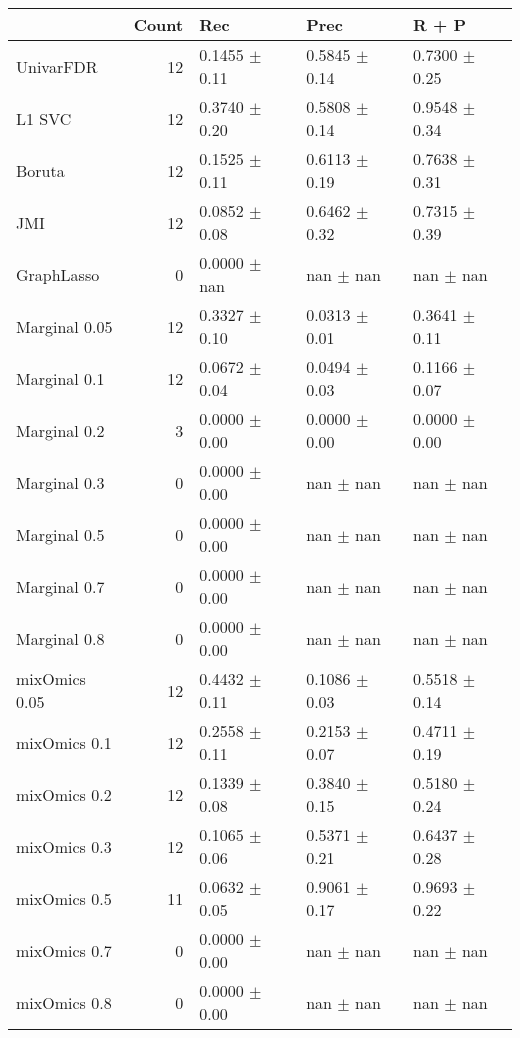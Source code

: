 \begin{tabular}{lrlll}
\toprule
{} &  Count &                Rec &               Prec &              R + P \\
\midrule
UnivarFDR     &     12 &  0.1455 $\pm$ 0.11 &  0.5845 $\pm$ 0.14 &  0.7300 $\pm$ 0.25 \\
L1 SVC        &     12 &  0.3740 $\pm$ 0.20 &  0.5808 $\pm$ 0.14 &  0.9548 $\pm$ 0.34 \\
Boruta        &     12 &  0.1525 $\pm$ 0.11 &  0.6113 $\pm$ 0.19 &  0.7638 $\pm$ 0.31 \\
JMI           &     12 &  0.0852 $\pm$ 0.08 &  0.6462 $\pm$ 0.32 &  0.7315 $\pm$ 0.39 \\
GraphLasso    &      0 &   0.0000 $\pm$ nan &      nan $\pm$ nan &      nan $\pm$ nan \\
Marginal 0.05 &     12 &  0.3327 $\pm$ 0.10 &  0.0313 $\pm$ 0.01 &  0.3641 $\pm$ 0.11 \\
Marginal 0.1  &     12 &  0.0672 $\pm$ 0.04 &  0.0494 $\pm$ 0.03 &  0.1166 $\pm$ 0.07 \\
Marginal 0.2  &      3 &  0.0000 $\pm$ 0.00 &  0.0000 $\pm$ 0.00 &  0.0000 $\pm$ 0.00 \\
Marginal 0.3  &      0 &  0.0000 $\pm$ 0.00 &      nan $\pm$ nan &      nan $\pm$ nan \\
Marginal 0.5  &      0 &  0.0000 $\pm$ 0.00 &      nan $\pm$ nan &      nan $\pm$ nan \\
Marginal 0.7  &      0 &  0.0000 $\pm$ 0.00 &      nan $\pm$ nan &      nan $\pm$ nan \\
Marginal 0.8  &      0 &  0.0000 $\pm$ 0.00 &      nan $\pm$ nan &      nan $\pm$ nan \\
mixOmics 0.05 &     12 &  0.4432 $\pm$ 0.11 &  0.1086 $\pm$ 0.03 &  0.5518 $\pm$ 0.14 \\
mixOmics 0.1  &     12 &  0.2558 $\pm$ 0.11 &  0.2153 $\pm$ 0.07 &  0.4711 $\pm$ 0.19 \\
mixOmics 0.2  &     12 &  0.1339 $\pm$ 0.08 &  0.3840 $\pm$ 0.15 &  0.5180 $\pm$ 0.24 \\
mixOmics 0.3  &     12 &  0.1065 $\pm$ 0.06 &  0.5371 $\pm$ 0.21 &  0.6437 $\pm$ 0.28 \\
mixOmics 0.5  &     11 &  0.0632 $\pm$ 0.05 &  0.9061 $\pm$ 0.17 &  0.9693 $\pm$ 0.22 \\
mixOmics 0.7  &      0 &  0.0000 $\pm$ 0.00 &      nan $\pm$ nan &      nan $\pm$ nan \\
mixOmics 0.8  &      0 &  0.0000 $\pm$ 0.00 &      nan $\pm$ nan &      nan $\pm$ nan \\
\bottomrule
\end{tabular}
